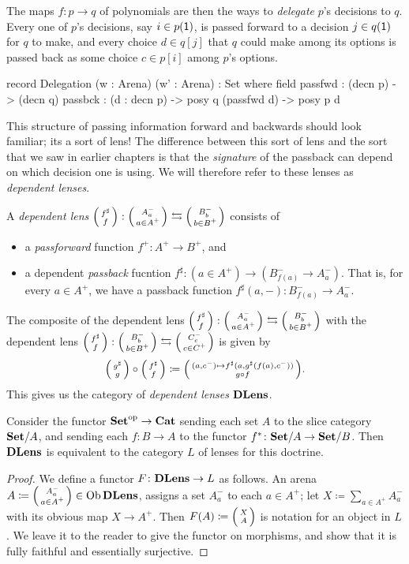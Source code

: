 \documentclass[DynamicalBook]{subfiles}
\begin{document}
The maps $f\colon p\to q$ of polynomials are then the ways to \emph{delegate} $p$'s decisions to $q$. Every one of $p$'s decisions, say $i\in p(\textsf{1})$, is passed forward to a decision $j\in q(\textsf{1})$ for $q$ to make, and every choice $d\in q[j]$ that $q$ could make among its options is passed back as some choice $c\in p[i]$ among $p$'s options.

\begin{agda}
record Delegation (w : Arena) (w' : Arena) : Set where
   field 
     passfwd : (decn p) -> (decn q)
     passbck : (d : decn p) -> posy q (passfwd d) -> posy p d
\end{agda}

This structure of passing information forward and backwards should look
familiar; its a sort of lens! The difference between this sort of lens and the
sort that we saw in earlier chapters is that the \emph{signature} of the
passback can depend on which decision one is using. We will therefore refer to
these lenses as \emph{dependent lenses}.
\begin{definition}\label{def.dependent_lens}
   A \emph{dependent lens} $\lens{f^{\sharp}}{f} : \lens{A^-_{a}}{a \in A^+}
   \fromto \lens{B^-_{b}}{b \in B^+}$ consists of 
\begin{itemize}
  \item a \emph{passforward} function $f^+ : A^+ \to B^+$, and
\item a dependent \emph{passback} fucntion $f^{\sharp} : (a \in A^+) \to  (
  B^-_{f(a)} \to A^-_{a})$. That is, for every $a \in A^+$, we have a
  passback function $f^{\sharp}(a, -) : B^-_{f(a)} \to A^-_{a}$.
\end{itemize}

The composite of the dependent lens $\lens{f^{\sharp}}{f} : \lens{A^-_{a}}{a \in A^+}
   \fromto \lens{B^-_{b}}{b \in B^+}$ with the dependent lens $\lens{f^{\sharp}}{f} : \lens{B^-_{b}}{b \in B^+}
   \fromto \lens{C^-_{c}}{c \in C^+}$ is given by 
\[
  \lens{g^{\sharp}}{g} \circ \lens{f^{\sharp}}{f} \coloneqq \lens{(a, c^-)
    \mapsto f^{\sharp}(a, g^{\sharp}(f(a), c^-))}{g \circ f}.
\]
This gives us the category of \emph{dependent lenses} $\textbf{DLens}$.
\end{definition}

\begin{proposition}\label{prop.dlens_self_indexing}
Consider the functor $\textbf{Set}^{\textnormal{op}}\to\textbf{Cat}$ sending each set $A$ to the slice category $\textbf{Set}/A$, and sending each $f\colon B\to A$ to the functor $f^*\colon\textbf{Set}/A\to\textbf{Set}/B$. Then $\textbf{DLens}$ is equivalent to the category $L$ of lenses for this doctrine.
\end{proposition}
\begin{proof}
We define a functor $F\colon \textbf{DLens}\to L$ as follows. An arena $A\coloneqq \lens{A^-_{a}}{a \in A^+}\in\Ob\Cat{DLens}$, assigns a set $A^-_a$ to each $a\in A^+$; let $X\coloneqq\sum_{a\in A^+}A^-_a$ with its obvious map $X\to A^+$. Then $F(A)\coloneqq\lens{X}{A}$ is notation for an object in $L$. We leave it to the reader to give the functor on morphisms, and show that it is fully faithful and essentially surjective.
\end{proof}
\end{document}
